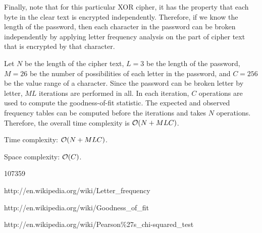 
Finally, note that for this particular XOR cipher, it has the property that each byte in the clear text is encrypted independently. Therefore, if we know the length of the password, then each character in the password can be broken independently by applying letter frequency analysis on the part of cipher text that is encrypted by that character.

\complexity

Let $N$ be the length of the cipher text, $L=3$ be the length of the password, $M=26$ be the number of possibilities of each letter in the password, and $C=256$ be the value range of a character. Since the password can be broken letter by letter, $ML$ iterations are performed in all. In each iteration, $C$ operations are used to compute the goodness-of-fit statistic. The expected and observed frequency tables can be computed before the iterations and takes $N$ operations. Therefore, the overall time complexity is $\mathcal{O}(N + MLC)$.

Time complexity: $\mathcal{O}(N + MLC)$.

Space complexity: $\mathcal{O}(C)$.

\answer

107359


http://en.wikipedia.org/wiki/Letter\_frequency

http://en.wikipedia.org/wiki/Goodness\_of\_fit

http://en.wikipedia.org/wiki/Pearson\%27s\_chi-squared\_test


 